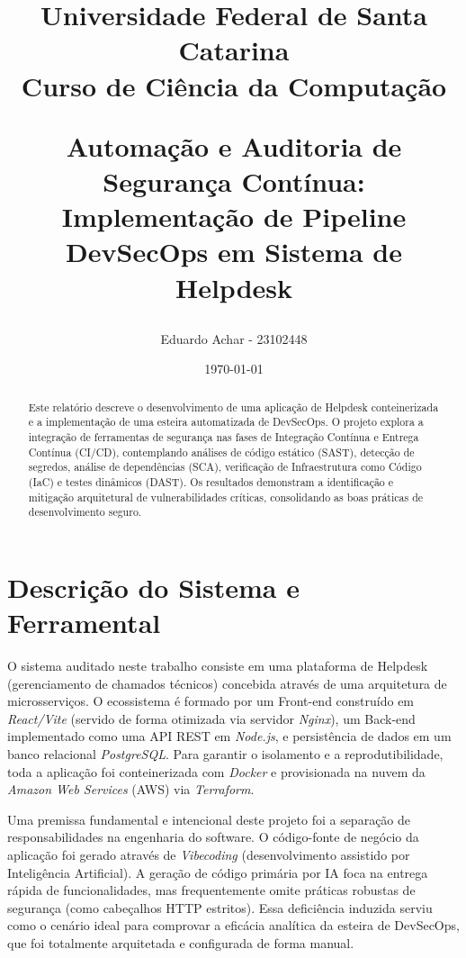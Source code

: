 \documentclass[12pt, a4paper]{article}
\title{
    \vspace{-2cm}
    \begin{center}
        \Large \textbf{Universidade Federal de Santa Catarina} \\
        \large Curso de Ciência da Computação
    \end{center}
    \vspace{2cm}
    \textbf{Automação e Auditoria de Segurança Contínua:\\ Implementação de Pipeline DevSecOps em Sistema de Helpdesk}
}
\author{Eduardo Achar - 23102448}
\date{\today}
\begin{document}
\maketitle
\thispagestyle{empty}

\begin{abstract}
Este relatório descreve o desenvolvimento de uma aplicação de Helpdesk conteinerizada e a implementação de uma esteira automatizada de DevSecOps. O projeto explora a integração de ferramentas de segurança nas fases de Integração Contínua e Entrega Contínua (CI/CD), contemplando análises de código estático (SAST), detecção de segredos, análise de dependências (SCA), verificação de Infraestrutura como Código (IaC) e testes dinâmicos (DAST). Os resultados demonstram a identificação e mitigação arquitetural de vulnerabilidades críticas, consolidando as boas práticas de desenvolvimento seguro.
\end{abstract}

\newpage
\tableofcontents
\newpage

\section{Descrição do Sistema e Ferramental}

O sistema auditado neste trabalho consiste em uma plataforma de Helpdesk (gerenciamento de chamados técnicos) concebida através de uma arquitetura de microsserviços. O ecossistema é formado por um Front-end construído em \textit{React/Vite} (servido de forma otimizada via servidor \textit{Nginx}), um Back-end implementado como uma API REST em \textit{Node.js}, e persistência de dados em um banco relacional \textit{PostgreSQL}. Para garantir o isolamento e a reprodutibilidade, toda a aplicação foi conteinerizada com \textit{Docker} e provisionada na nuvem da \textit{Amazon Web Services} (AWS) via \textit{Terraform}.

Uma premissa fundamental e intencional deste projeto foi a separação de responsabilidades na engenharia do software. O código-fonte de negócio da aplicação foi gerado através de \textit{Vibecoding} (desenvolvimento assistido por Inteligência Artificial). A geração de código primária por IA foca na entrega rápida de funcionalidades, mas frequentemente omite práticas robustas de segurança (como cabeçalhos HTTP estritos). Essa deficiência induzida serviu como o cenário ideal para comprovar a eficácia analítica da esteira de DevSecOps, que foi totalmente arquitetada e configurada de forma manual.
\end{document}
